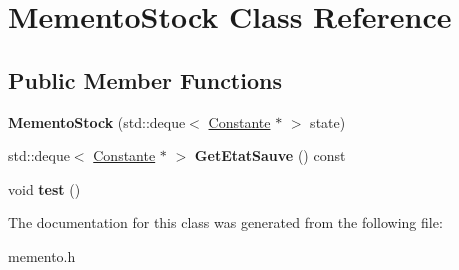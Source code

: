 \hypertarget{class_memento_stock}{\section{Memento\-Stock Class Reference}
\label{class_memento_stock}
}
\subsection*{Public Member Functions}
\begin{DoxyCompactItemize}
\item 
\hypertarget{class_memento_stock_a31a9bd8576254b31edc21c885d0f0376}{{\bfseries Memento\-Stock} (std\-::deque$<$ \hyperlink{class_constante}{Constante} $\ast$ $>$ state)}\label{class_memento_stock_a31a9bd8576254b31edc21c885d0f0376}

\item 
\hypertarget{class_memento_stock_a14cee296b4fdf6fc421835d6df568100}{std\-::deque$<$ \hyperlink{class_constante}{Constante} $\ast$ $>$ {\bfseries Get\-Etat\-Sauve} () const }\label{class_memento_stock_a14cee296b4fdf6fc421835d6df568100}

\item 
\hypertarget{class_memento_stock_a8ef683ceb96cac42e432ba5845efb88b}{void {\bfseries test} ()}\label{class_memento_stock_a8ef683ceb96cac42e432ba5845efb88b}

\end{DoxyCompactItemize}


The documentation for this class was generated from the following file\-:\begin{DoxyCompactItemize}
\item 
memento.\-h\end{DoxyCompactItemize}
